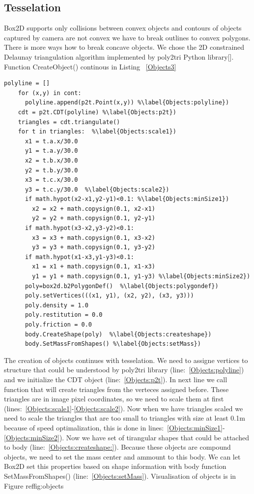 \documentclass{ifacconf}
\begin{document}
\subsection{Tesselation}
Box2D supports only collisions between convex objects and contours of objects
captured by camera are not convex we have to break outlines to convex polygons.
There is more ways how to break concave objects. We chose the 2D constrained
Delaunay triangulation algorithm implemented by poly2tri Python
library[\cite{Delauanay}]. Function CreateObject() continous in Listing~
\ref{Objects3}
\begin{lstlisting}[name=Objects,firstnumber=auto,label=Objects3,caption=Creation
 of objects]
    polyline = []
    for (x,y) in cont:
      polyline.append(p2t.Point(x,y)) %\label{Objects:polyline})
    cdt = p2t.CDT(polyline) %\label{Objects:p2t})
    triangles = cdt.triangulate()
    for t in triangles:  %\label{Objects:scale1})
      x1 = t.a.x/30.0
      y1 = t.a.y/30.0
      x2 = t.b.x/30.0
      y2 = t.b.y/30.0
      x3 = t.c.x/30.0
      y3 = t.c.y/30.0  %\label{Objects:scale2})
      if math.hypot(x2-x1,y2-y1)<0.1: %\label{Objects:minSize1})
        x2 = x2 + math.copysign(0.1, x2-x1)
        y2 = y2 + math.copysign(0.1, y2-y1)
      if math.hypot(x3-x2,y3-y2)<0.1:
        x3 = x3 + math.copysign(0.1, x3-x2)
        y3 = y3 + math.copysign(0.1, y3-y2)
      if math.hypot(x1-x3,y1-y3)<0.1:
        x1 = x1 + math.copysign(0.1, x1-x3)
        y1 = y1 + math.copysign(0.1, y1-y3) %\label{Objects:minSize2})
      poly=box2d.b2PolygonDef()  %\label{Objects:polygondef})
      poly.setVertices(((x1, y1), (x2, y2), (x3, y3)))
      poly.density = 1.0
      poly.restitution = 0.0
      poly.friction = 0.0
      body.CreateShape(poly)  %\label{Objects:createshape})
      body.SetMassFromShapes() %\label{Objects:setMass})
\end{lstlisting}
The creation of objects continues with tesselation. We need to assigne vertices
to structure that could be understood by poly2tri library
(line:~\ref{Objects:polyline}) and we initialize the CDT object
(line:~\ref{Objects:p2t}). In next line we call function that will create
triangles from the verteces assigned before. These triangles are in image pixel
coordinates, so we need to scale them at first
(lines:~\ref{Objects:scale1}-\ref{Objects:scale2}). Now when we have triangles
scaled we need to scale the triangles that are too small to triangles with size
at least 0.1m because of speed optimalization, this is done in
lines:~\ref{Objects:minSize1}-\ref{Objects:minSize2}). Now we have set of
tirangular shapes that could be attached to body
(line:~\ref{Objects:createshape:}). Because these objects are compound objects,
we need to set the mass center and ammount to this body. We can let Box2D set
this properties based on shape information with body function
SetMassFromShapes() (line:~\ref{Objects:setMass}). Visualisation of objects is
in Figure ref{fig:objects}
\end{document}
